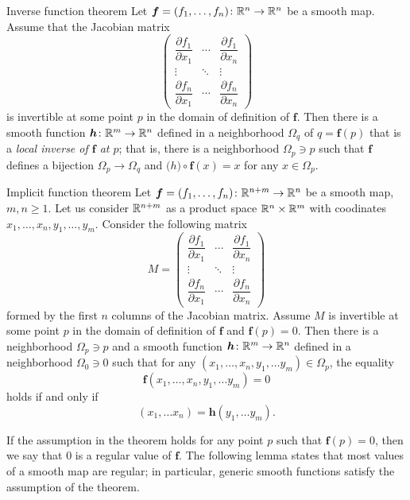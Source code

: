 \begin{thm}{Inverse function theorem}\label{thm:inverse}
Let $\bm{f}=(f_1,\dots,f_n)\colon\mathbb{R}^n\to\mathbb{R}^n$ be a smooth map.
Assume that the Jacobian matrix
\[
\begin{pmatrix}
\dfrac{\partial f_1}{\partial x_1} & \cdots & \dfrac{\partial f_1}{\partial x_n}\\
\vdots & \ddots & \vdots\\
\dfrac{\partial f_n}{\partial x_1} & \cdots & \dfrac{\partial f_n}{\partial x_n} \end{pmatrix}\]
is invertible at some point $p$ in the domain of definition of $\bm{f}$.
Then there is a smooth function $\bm{h}\colon\mathbb{R}^m\to\mathbb{R}^n$ defined in a neighborhood $\Omega_q$ of $q=\bm{f}(p)$ that is a \emph{local inverse of $\bm{f}$ at $p$};
that is, there is a neighborhood $\Omega_p\ni p$ such that
$\bm{f}$ defines a bijection $\Omega_p\to \Omega_q$ and
$\bm(h) \circ \bm{f}(x)=x$ for any $x\in \Omega_p$.
\end{thm}

\begin{thm}{Implicit function theorem}\label{thm:imlicit}
Let $\bm{f}=(f_1,\dots,f_n)\colon\mathbb{R}^{n+m}\to\mathbb{R}^n$ be a smooth map,
$m,n\ge 1$.
Let us consider $\mathbb{R}^{n+m}$ as a product space $\mathbb{R}^n\times \mathbb{R}^m$ with coodinates 
$x_1,\dots,x_n,y_1,\dots,y_m$.
Consider the following matrix 
\[
M=\begin{pmatrix}
\dfrac{\partial f_1}{\partial x_1} & \cdots & \dfrac{\partial f_1}{\partial x_n}\\
\vdots & \ddots & \vdots\\
\dfrac{\partial f_n}{\partial x_1} & \cdots & \dfrac{\partial f_n}{\partial x_n} \end{pmatrix}\]
formed by the first $n$ columns of the Jacobian matrix.
Assume $M$ is invertible at some point $p$ in the domain of definition of $\bm{f}$ and $\bm{f}(p)=0$.
Then there is a neighborhood $\Omega_p\ni p$
and a smooth function $\bm{h}\colon\mathbb{R}^m\to\mathbb{R}^n$ defined in a neighborhood $\Omega_0\ni 0$ such that
for any $(x_1,\dots,x_n,y_1,\dots y_m)\in \Omega_p$, the equality
\[\bm{f}(x_1,\dots,x_n,y_1,\dots y_m)=0\]
holds if and only if 
\[(x_1,\dots x_n)=\bm{h}(y_1,\dots y_m).\]

\end{thm}

If the assumption in the theorem holds for any point $p$ such that $\bm{f}(p)=0$,
then we say that $0$ is a regular value of $\bm{f}$.
The following lemma states that most values of a smooth map are regular;
in particular, generic smooth functions satisfy the assumption of the theorem.

